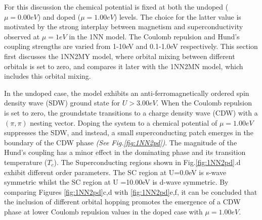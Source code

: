 \documentclass[11pt]{article}
\begin{document}
\noindent For this discussion the chemical potential is fixed at both the undoped ($\mu = 0.00eV $) and doped ($\mu =1.00eV$) levels. The choice for the latter value is motivated 
by the strong interplay between magnetism and superconductivity observed at $\mu=1eV$ in the 1NN model.  The Coulomb repulsion and Hund's coupling strengths are varied from 1-10eV and 0.1-1.0eV respectively.
This section first discusses the 1NN2MY model, where orbital mixing between different orbitals is set to zero, and compares it later with the 1NN2MN model, which includes this orbital mixing. \par
\medskip
\noindent In the undoped case, the model exhibits an anti-ferromagnetically ordered spin density wave (SDW) ground state
for $U > 3.00eV$. When the Coulomb repulsion is set to zero, the groundstate transitions to a charge density wave (CDW) with a $(\pi, \pi)$ nesting vector. 
Doping the system to a chemical potential of $\mu = 1.00eV$ suppresses the SDW, and instead, a small superconducting patch 
emerges in the boundary of the CDW phase \textit{(See Fig.{\ref{fig:1NN2pd}})}. The magnitude of the Hund's coupling has a minor effect in the dominating phase and its transition temperature ($T_c$).
The Superconducting regions shown in Fig.\ref{fig:1NN2pd}.d exhibit different order parameters. The SC region at U=0.0eV is s-wave symmetric whilst the SC region at U =10.00eV
is d-wave symmetric. By comparing Figures \ref{fig:1NN2pd}c,d with \ref{fig:1NN2pd}e,f, it can be concluded that the inclusion of different orbital hopping promotes the emergence of a CDW phase at lower Coulomb repulsion values in the doped case with $\mu = 1.00eV$.
\end{document}
